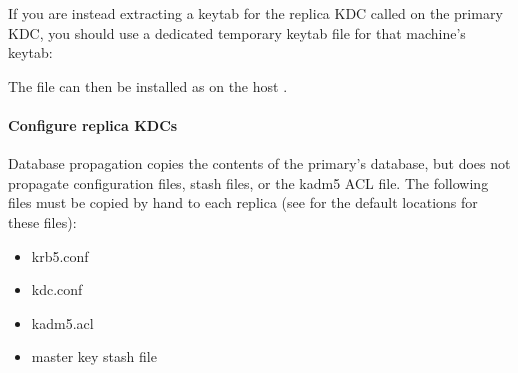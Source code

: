 \documentclass[letterpaper,10pt,english]{sphinxmanual}
\begin{document}
If you are instead extracting a keytab for the replica KDC called
 on the primary KDC, you should use a dedicated
temporary keytab file for that machine’s keytab:

%
\begin{sphinxVerbatim}[commandchars=\\\{\}]
    
       
         
       
         
\end{sphinxVerbatim}

The file  can then be installed as
 on the host .


\paragraph{Configure replica KDCs}
\label{\detokenize{admin/install_kdc:configure-replica-kdcs}}
Database propagation copies the contents of the primary’s database,
but does not propagate configuration files, stash files, or the kadm5
ACL file.  The following files must be copied by hand to each replica
(see {\hyperref[\detokenize{mitK5defaults:mitk5defaults}]{}} for the default locations for these files):
\begin{itemize}
\item {} 
krb5.conf

\item {} 
kdc.conf

\item {} 
kadm5.acl

\item {} 
master key stash file

\end{itemize}
\end{document}
